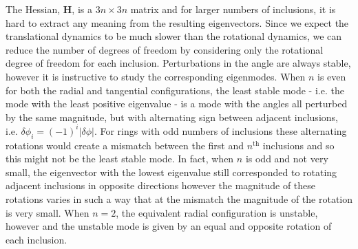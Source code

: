 The Hessian, $\mathbf{H}$, is a $3n\times3n$ matrix and for larger numbers of inclusions, it is hard to extract any meaning from the resulting eigenvectors. Since we expect the translational dynamics to be much slower than the rotational dynamics, we can reduce the number of degrees of freedom by considering only the rotational degree of freedom for each inclusion. Perturbations in the angle are always stable, however it is instructive to study the corresponding eigenmodes. When $n$ is even for both the radial and tangential configurations, the least stable mode - i.e. the mode with the least positive eigenvalue - is a mode with the angles all perturbed by the same magnitude, but with alternating sign between adjacent inclusions, i.e. $\delta\phi_i = (-1)^{i}|\delta\phi|$. For rings with odd numbers of inclusions these alternating rotations would create a mismatch between the first and $n^{\text{th}}$ inclusions and so this might not be the least stable mode. In fact, when $n$ is odd and not very small, the eigenvector with the lowest eigenvalue still corresponded to rotating adjacent inclusions in opposite directions however the magnitude of these rotations varies in such a way that at the mismatch the magnitude of the rotation is very small. When $n=2$, the equivalent radial configuration is unstable, however and the unstable mode is given by an equal and opposite rotation of each inclusion.

